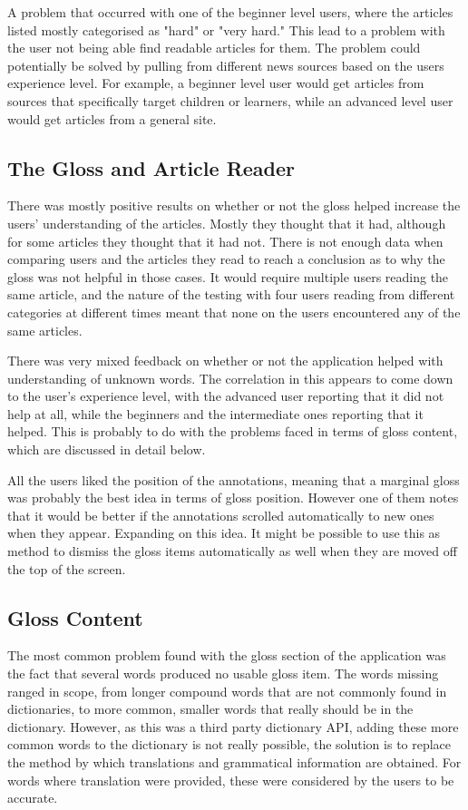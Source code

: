 A problem that occurred with one of the beginner level users, where the articles listed mostly categorised as "hard" or "very hard." This lead to a problem with the user not being able find readable articles for them. The problem could potentially be solved by pulling from different news sources based on the users experience level. For example, a beginner level user would get articles from sources that specifically target children or learners, while an advanced level user would get articles from a general site.

\subsection{The Gloss and Article Reader}

There was mostly positive results on whether or not the gloss helped increase the users' understanding of the articles. Mostly they thought that it had, although for some articles they thought that it had not. There is not enough data when comparing users and the articles they read to reach a conclusion as to why the gloss was not helpful in those cases. It would require multiple users reading the same article, and the nature of the testing with four users reading from different categories at different times meant that none on the users encountered any of the same articles. 

There was very mixed feedback on whether or not the application helped with understanding of unknown words. The correlation in this appears to come down to the user's experience level, with the advanced user reporting that it did not help at all, while the beginners and the intermediate ones reporting that it helped. This is probably to do with the problems faced in terms of gloss content, which are discussed in detail below.

All the users liked the position of the annotations, meaning that a marginal gloss was probably the best idea in terms of gloss position. However one of them notes that it would be better if the annotations scrolled automatically to new ones when they appear. Expanding on this idea. It might be possible to use this as method to dismiss the gloss items automatically as well when they are moved off the top of the screen.

\subsection{Gloss Content}

The most common problem found with the gloss section of the application was the fact that several words produced no usable gloss item. The words missing ranged in scope, from longer compound words that are not commonly found in dictionaries, to more common, smaller words that really should be in the dictionary. However, as this was a third party dictionary API, adding these more common words to the dictionary is not really possible, the solution is to replace the method by which translations and grammatical information are obtained. For words where translation were provided, these were considered by the users to be accurate. 

